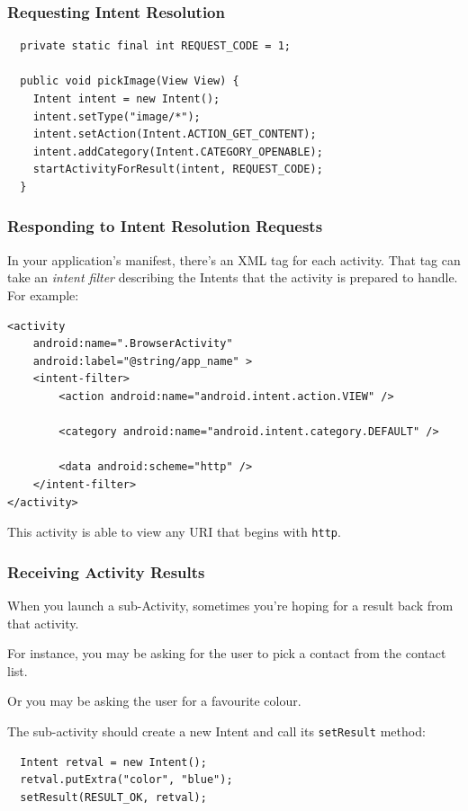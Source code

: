 \begin{frame}[fragile]
\frametitle{Requesting Intent Resolution}
\begin{changemargin}{1cm}

{\small 
\begin{verbatim}
  private static final int REQUEST_CODE = 1;

  public void pickImage(View View) {
    Intent intent = new Intent();
    intent.setType("image/*");
    intent.setAction(Intent.ACTION_GET_CONTENT);
    intent.addCategory(Intent.CATEGORY_OPENABLE);
    startActivityForResult(intent, REQUEST_CODE);
  }
\end{verbatim}
}


\end{changemargin}
\end{frame}

\begin{frame}[fragile]
\frametitle{Responding to Intent Resolution Requests}
\begin{changemargin}{1cm}

In your application's manifest, there's an XML tag for each activity.
That tag can take an \emph{intent filter} describing the Intents
that the activity is prepared to handle. For example:
{\scriptsize 
\begin{verbatim}
<activity
    android:name=".BrowserActivity"
    android:label="@string/app_name" >
    <intent-filter>
        <action android:name="android.intent.action.VIEW" />

        <category android:name="android.intent.category.DEFAULT" />

        <data android:scheme="http" />
    </intent-filter>
</activity>
\end{verbatim}
}
This activity is able to view any URI that begins with {\tt http}.


\end{changemargin}
\end{frame}

\begin{frame}[fragile]
\frametitle{Receiving Activity Results}
\begin{changemargin}{1cm}

When you launch a sub-Activity, sometimes you're hoping for a result
back from that activity. 

For instance, you may be asking for the
user to pick a contact from the contact list. 

Or you may be asking the
user for a favourite colour. 

The sub-activity should
create a new Intent and call its {\tt setResult} method:

{\scriptsize 
\begin{verbatim}
  Intent retval = new Intent();
  retval.putExtra("color", "blue");
  setResult(RESULT_OK, retval);
\end{verbatim}
}


\end{changemargin}
\end{frame}


